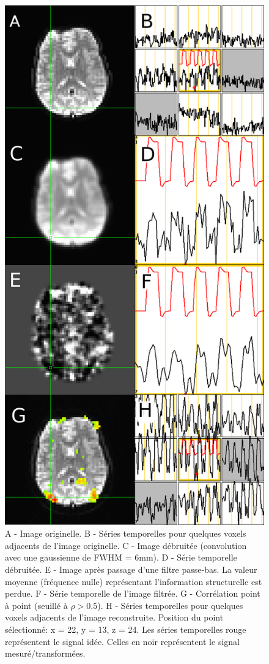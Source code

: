 \documentclass[a4paper]{article}
\begin{document}
\begin{figure}[h]
   \caption{\label{fmri_reconstruction} A - Image originelle. B - Séries temporelles pour quelques voxels adjacents de l'image originelle. C - Image débruitée (convolution avec une gaussienne de FWHM = 6mm). D - Série temporelle débruitée. E - Image après passage d'une filtre passe-bas. La valeur moyenne (fréquence nulle) représentant l'information structurelle est perdue. F - Série temporelle de l'image filtrée. G - Corrélation point à point (seuillé à $\rho > 0.5$). H - Séries temporelles pour quelques voxels adjacents de l'image reconstruite. Position du point sélectionné: x = 22, y = 13, z = 24. Les séries temporelles rouge représentent le signal idée. Celles en noir représentent le signal mesuré/transformées.}
   \centering
   \includegraphics[height=0.85\textheight]{fmri_reconstruction}
\end{figure}
\end{document}
